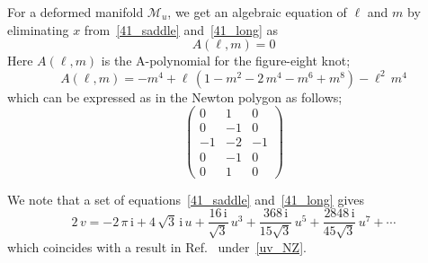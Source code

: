 \documentclass[12pt,reqno]{amsart}
\numberwithin{equation}{section}
\newcommand{\I}{\mathrm{i}}
\begin{document}
  For a deformed manifold $\mathcal{M}_u$,
  we get an algebraic equation of $\ell$ and $m$ by eliminating $x$
  from~\eqref{41_saddle} and~\eqref{41_long} as
  \begin{equation}
    A(\ell , m) = 0
  \end{equation}
  Here  $A(\ell, m)$ is the A-polynomial for the figure-eight knot;
  \begin{equation}
    A(\ell,m)
    =
    - m^4 + \ell \, (1 - m^2 - 2 \, m^4 - m^6 + m^8 )
    -
    \ell^2 \, m^4
  \end{equation}
  which can be  expressed as in the Newton polygon as follows;
  \begin{equation*}
    \begin{pmatrix}
      0 & 1 & 0 \\
      0 & -1 & 0 \\
      -1 &-2 & -1 \\
      0 & -1 & 0 \\
      0 & 1 & 0
    \end{pmatrix}
  \end{equation*}


  We note that a set of equations~\eqref{41_saddle}
  and~\eqref{41_long} gives
  \begin{equation*}
    2 \, v
    =
    -2 \, \pi \, \I + 4\, \sqrt{3} \,  \I \, u
    + \frac{16 \, \I}{\sqrt{3}} \, u^3
    +
    \frac{368 \, \I}{15 \sqrt{3}} \, u^5
    +
    \frac{2848 \, \I}{45 \sqrt{3}} \, u^7
    + \cdots
  \end{equation*}
  which coincides with a result in Ref.~
  under~\eqref{uv_NZ}.
\end{document}
